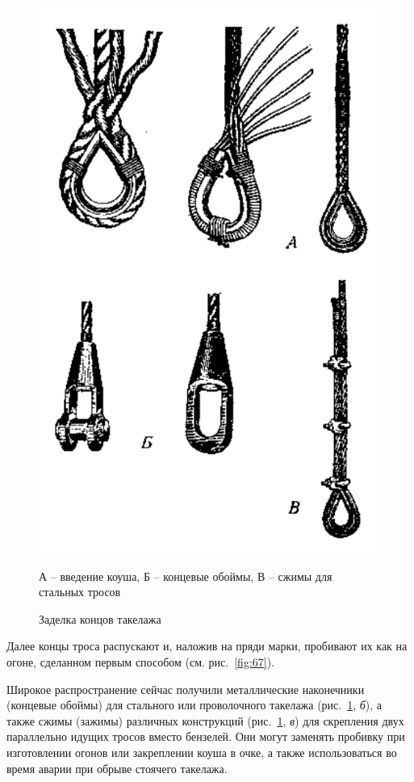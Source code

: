 \documentclass[a4paper, 12pt, twoside, final]{scrbook}
\begin{document}
\begin{figure}[htbp]
   \centering
   \includegraphics{pics/68_Zadelka_koncov_takelazha} %
   \caption{Заделка концов такелажа}
   \label{fig:68}
   \centering\small
   А \--- введение коуша, Б \--- концевые обоймы, В \--- сжимы для стальных тросов
\end{figure}

Далее концы троса распускают и, наложив на пряди марки, пробивают их как на огоне, сделанном первым способом (см. рис.~\ref{fig:67}). 

Широкое распространение сейчас получили металлические наконечники (концевые обоймы) для стального или проволочного такелажа (рис.~\ref{fig:68}, \textit{б}), а также сжимы (зажимы) различных конструкций (рис.~\ref{fig:68}, \textit{в}) для скрепления двух параллельно идущих тросов вместо бензелей. Они могут заменять пробивку при изготовлении огонов или закреплении коуша в очке, а также использоваться во время аварии при обрыве стоячего такелажа.
\end{document}
